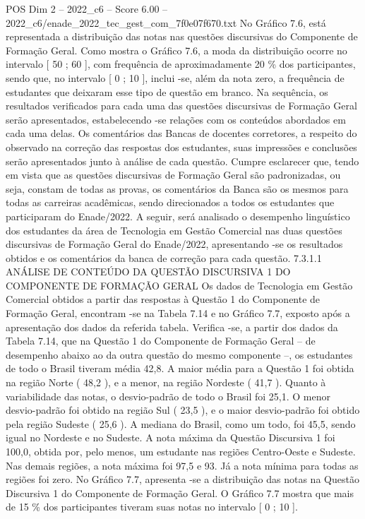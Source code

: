 \begin{textsample}{POS Dim 2 – 2022\_c6 – Score 6.00 – 2022\_c6/enade\_2022\_tec\_gest\_com\_7f0e07f670.txt}
No Gráfico 7.6, está representada a distribuição das notas nas questões discursivas do Componente de Formação Geral.
Como mostra o Gráfico 7.6, a moda da distribuição ocorre no intervalo [ 50 ; 60 ], com frequência de aproximadamente 20 \% dos participantes, sendo que, no intervalo [ 0 ; 10 ], inclui -se, além da nota zero, a frequência de estudantes que deixaram esse tipo de questão em branco.
Na sequência, os resultados verificados para cada uma das questões discursivas de Formação Geral serão apresentados, estabelecendo -se relações com os conteúdos abordados em cada uma delas.
Os comentários das Bancas de docentes corretores, a respeito do observado na correção das respostas dos estudantes, suas impressões e conclusões serão apresentados junto à análise de cada questão.
Cumpre esclarecer que, tendo em vista que as questões discursivas de Formação Geral são padronizadas, ou seja, constam de todas as provas, os comentários da Banca são os mesmos para todas as carreiras acadêmicas, sendo direcionados a todos os estudantes que participaram do Enade/2022.
A seguir, será analisado o desempenho linguístico dos estudantes da área de Tecnologia em Gestão Comercial nas duas questões discursivas de Formação Geral do Enade/2022, apresentando -se os resultados obtidos e os comentários da banca de correção para cada questão. 7.3.1.1 ANÁLISE DE CONTEÚDO DA QUESTÃO DISCURSIVA 1 DO COMPONENTE DE FORMAÇÃO GERAL Os dados de Tecnologia em Gestão Comercial obtidos a partir das respostas à Questão 1 do Componente de Formação Geral, encontram -se na Tabela 7.14 e no Gráfico 7.7, exposto após a apresentação dos dados da referida tabela.
Verifica -se, a partir dos dados da Tabela 7.14, que na Questão 1 do Componente de Formação Geral – de desempenho abaixo ao da outra questão do mesmo componente –, os estudantes de todo o Brasil tiveram média 42,8.
A maior média para a Questão 1 foi obtida na região Norte ( 48,2 ), e a menor, na região Nordeste ( 41,7 ).
Quanto à variabilidade das notas, o desvio-padrão de todo o Brasil foi 25,1.
O menor desvio-padrão foi obtido na região Sul ( 23,5 ), e o maior desvio-padrão foi obtido pela região Sudeste ( 25,6 ).
A mediana do Brasil, como um todo, foi 45,5, sendo igual no Nordeste e no Sudeste.
A nota máxima da Questão Discursiva 1 foi 100,0, obtida por, pelo menos, um estudante nas regiões Centro-Oeste e Sudeste.
Nas demais regiões, a nota máxima foi 97,5 e 93.
Já a nota mínima para todas as regiões foi zero.
No Gráfico 7.7, apresenta -se a distribuição das notas na Questão Discursiva 1 do Componente de Formação Geral.
O Gráfico 7.7 mostra que mais de 15 \% dos participantes tiveram suas notas no intervalo [ 0 ; 10 ].

\end{textsample}
